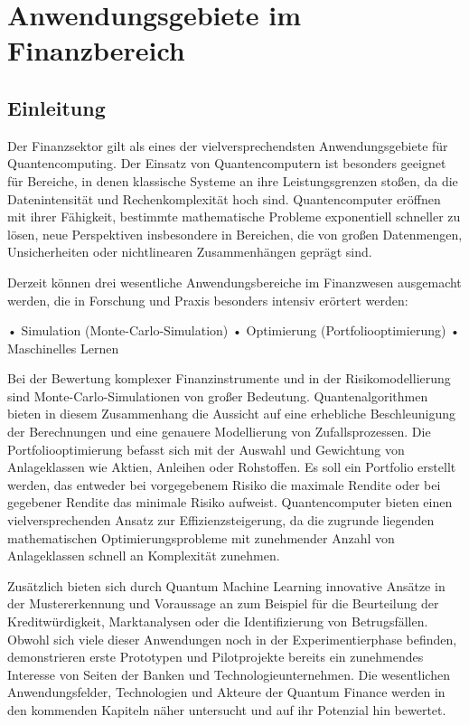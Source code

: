 \chapter{Anwendungsgebiete im Finanzbereich}
\label{trends} %



\section{Einleitung}
Der Finanzsektor gilt als eines der vielversprechendsten Anwendungsgebiete für Quantencomputing. Der Einsatz von Quantencomputern ist besonders geeignet für Bereiche, in denen klassische Systeme an ihre Leistungsgrenzen stoßen, da die Datenintensität und Rechenkomplexität hoch sind. Quantencomputer eröffnen mit ihrer Fähigkeit, bestimmte mathematische Probleme exponentiell schneller zu lösen, neue Perspektiven insbesondere in Bereichen, die von großen Datenmengen, Unsicherheiten oder nichtlinearen Zusammenhängen geprägt sind.

Derzeit können drei wesentliche Anwendungsbereiche im Finanzwesen ausgemacht werden, die in Forschung und Praxis besonders intensiv erörtert werden:

• Simulation (Monte-Carlo-Simulation)
• Optimierung (Portfoliooptimierung)
• Maschinelles Lernen
 
Bei der Bewertung komplexer Finanzinstrumente und in der Risikomodellierung sind Monte-Carlo-Simulationen von großer Bedeutung. Quantenalgorithmen bieten in diesem Zusammenhang die Aussicht auf eine erhebliche Beschleunigung der Berechnungen und eine genauere Modellierung von Zufallsprozessen.
Die Portfoliooptimierung befasst sich mit der Auswahl und Gewichtung von Anlageklassen wie Aktien, Anleihen oder Rohstoffen. Es soll ein Portfolio erstellt werden, das entweder bei vorgegebenem Risiko die maximale Rendite oder bei gegebener Rendite das minimale Risiko aufweist. Quantencomputer bieten einen vielversprechenden Ansatz zur Effizienzsteigerung, da die zugrunde liegenden mathematischen Optimierungsprobleme mit zunehmender Anzahl von Anlageklassen schnell an Komplexität zunehmen.

Zusätzlich bieten sich durch Quantum Machine Learning innovative Ansätze in der Mustererkennung und Voraussage an zum Beispiel für die Beurteilung der Kreditwürdigkeit, Marktanalysen oder die Identifizierung von Betrugsfällen. Obwohl sich viele dieser Anwendungen noch in der Experimentierphase befinden, demonstrieren erste Prototypen und Pilotprojekte bereits ein zunehmendes Interesse von Seiten der Banken und Technologieunternehmen.
Die wesentlichen Anwendungsfelder, Technologien und Akteure der Quantum Finance werden in den kommenden Kapiteln näher untersucht und auf ihr Potenzial hin bewertet.


